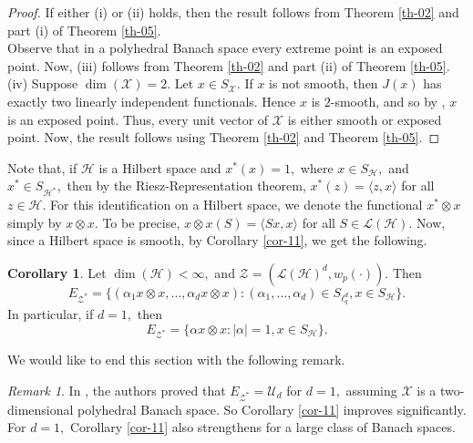 \documentclass{amsart}
\theoremstyle{definition}
\newtheorem{cor}[theorem]{Corollary}
\theoremstyle{remark}
\newtheorem{remark}[theorem]{Remark}
\numberwithin{equation}{section}
\begin{document}
\begin{proof}
If either (i) or (ii) holds, then the result follows from Theorem \ref{th-02} and  part (i) of Theorem \ref{th-05}.\\
 Observe that in a polyhedral Banach space every extreme point is an exposed point. Now, (iii) follows from 	Theorem \ref{th-02} and  part (ii) of Theorem \ref{th-05}.\\
 (iv) Suppose $\dim(\mathcal{X})=2.$ Let $x\in S_{\mathcal{X}}.$ If $x$ is not smooth, then $J(x)$ has exactly two linearly independent functionals. Hence $x$ is $2$-smooth, and so by \cite[Th. 4.2]{Wo}, $x$ is an exposed point. Thus, every unit vector of $\mathcal{X}$ is either smooth or exposed point. Now, the result follows using Theorem \ref{th-02} and  Theorem \ref{th-05}.
\end{proof}

Note that, if $\mathcal{H}$ is a Hilbert space and $x^*(x)=1,$ where $x\in S_{\mathcal{H}},$ and $ x^*\in S_{\mathcal{H}^*},$ then by the Riesz-Representation theorem, $x^*(z)=\langle z,x\rangle$ for all $z\in \mathcal{H}.$ For this identification on a Hilbert space, we denote the functional $x^*\otimes x$ simply by $x\otimes x.$ To be precise, $x\otimes x(S)=\langle Sx,x\rangle$ for all  $S\in \mathcal{L}(\mathcal{H}).$ Now, since a Hilbert space is smooth, by Corollary \ref{cor-11}, we get the following.

\begin{cor}
Let $\dim(\mathcal{H})<\infty,$ and $\mathcal{Z}=(\mathcal{L}(\mathcal{H})^d,w_p(\cdot)).$ Then 	
\[E_{\mathcal{Z}^*}=\{(\alpha_1x\otimes x,\ldots,\alpha_dx\otimes x):(\alpha_1,\ldots,\alpha_d)\in S_{\ell_q^d},x\in S_{\mathcal{H}}\}.\]
In particular, if $d=1,$ then 
\[E_{\mathcal{Z}^*}=\{\alpha x\otimes x:|\alpha|=1,x\in S_{\mathcal{H}}\}.\]
\end{cor} 





We would like to end this section with the following remark.
\begin{remark}
In \cite[Th. 4.6]{DMP}, the authors proved that $E_{\mathcal{Z}^*}=\mathcal{U}_d$ for $d=1,$ assuming $\mathcal{X}$ is a two-dimensional polyhedral Banach space. So Corollary \ref{cor-11}	improves \cite[Th. 4.6]{DMP} significantly. For $d=1,$ Corollary \ref{cor-11} also strengthens \cite[Th. 2.3]{M2} for a large class of Banach spaces.
\end{remark}
\end{document}
